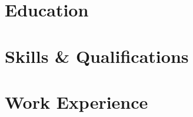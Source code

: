 \documentclass{resume}
\begin{document}

\makeheader

\section{Education}
\section{Skills \& Qualifications}
\section{Work Experience}
\end{document}
